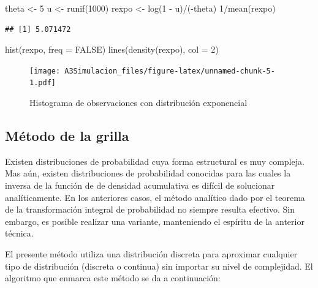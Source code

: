 \documentclass[
  10pt,
  spanish,
]{book}
\newenvironment{Shaded}{\begin{snugshade}}{\end{snugshade}}
\newcommand{\AttributeTok}[1]{\textcolor[rgb]{0.77,0.63,0.00}{#1}}
\newcommand{\ConstantTok}[1]{\textcolor[rgb]{0.00,0.00,0.00}{#1}}
\newcommand{\DecValTok}[1]{\textcolor[rgb]{0.00,0.00,0.81}{#1}}
\newcommand{\FunctionTok}[1]{\textcolor[rgb]{0.00,0.00,0.00}{#1}}
\newcommand{\NormalTok}[1]{#1}
\newcommand{\OtherTok}[1]{\textcolor[rgb]{0.56,0.35,0.01}{#1}}
\newcommand{\SpecialCharTok}[1]{\textcolor[rgb]{0.00,0.00,0.00}{#1}}
\theoremstyle{definition}
\theoremstyle{definition}
\theoremstyle{definition}
\theoremstyle{definition}
\theoremstyle{remark}
\begin{document}
\begin{Shaded}
\begin{Highlighting}[]
\NormalTok{theta }\OtherTok{\textless{}{-}} \DecValTok{5}
\NormalTok{u }\OtherTok{\textless{}{-}} \FunctionTok{runif}\NormalTok{(}\DecValTok{1000}\NormalTok{)}
\NormalTok{rexpo }\OtherTok{\textless{}{-}} \FunctionTok{log}\NormalTok{(}\DecValTok{1} \SpecialCharTok{{-}}\NormalTok{ u)}\SpecialCharTok{/}\NormalTok{(}\SpecialCharTok{{-}}\NormalTok{theta)}
\DecValTok{1}\SpecialCharTok{/}\FunctionTok{mean}\NormalTok{(rexpo)}
\end{Highlighting}
\end{Shaded}

\begin{verbatim}
## [1] 5.071472
\end{verbatim}

\begin{Shaded}
\begin{Highlighting}[]
\FunctionTok{hist}\NormalTok{(rexpo, }\AttributeTok{freq =} \ConstantTok{FALSE}\NormalTok{)}
\FunctionTok{lines}\NormalTok{(}\FunctionTok{density}\NormalTok{(rexpo), }\AttributeTok{col =} \DecValTok{2}\NormalTok{)}
\end{Highlighting}
\end{Shaded}

\begin{figure}
\centering
\texttt{[image: A3Simulacion\_files/figure-latex/unnamed-chunk-5-1.pdf]}
\caption{\label{fig:unnamed-chunk-5}Histograma de observaciones con distribución exponencial}
\end{figure}

\hypertarget{muxe9todo-de-la-grilla}{%
\subsection{Método de la grilla}\label{muxe9todo-de-la-grilla}}

Existen distribuciones de probabilidad cuya forma estructural es muy compleja. Mas aún, existen distribuciones de probabilidad conocidas para las cuales la inversa de la función de de densidad acumulativa es difícil de solucionar analíticamente. En los anteriores casos, el método analítico dado por el teorema de la transformación integral de probabilidad no siempre resulta efectivo. Sin embargo, es posible realizar una variante, manteniendo el espíritu de la anterior técnica.

El presente método utiliza una distribución discreta para aproximar cualquier tipo de distribución (discreta o continua) sin importar su nivel de complejidad. El algoritmo que enmarca este método se da a continuación:
\end{document}
